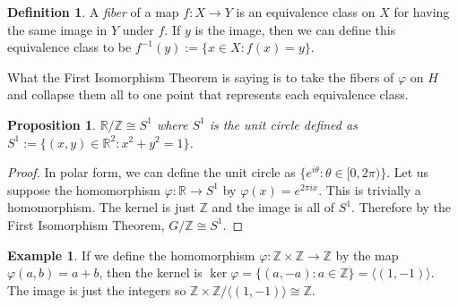 \documentclass{article}
\newcommand{\R}{\mathbb{R}}
\newcommand{\Z}{\mathbb{Z}}
\newtheorem{proposition}[theorem]{Proposition}
\theoremstyle{definition}
\newtheorem{definition}[theorem]{Definition}
\newtheorem{example}[theorem]{Example}
\begin{document}
\begin{definition}
    A \emph{fiber} of a map $f:X\to Y$ is an equivalence class on $X$ for having the same image in $Y$ under $f$. If $y$ is the image, then we can define this equivalence class to be $f^{-1}(y) := \{ x\in X:f(x)=y\}$.
\end{definition}
What the First Isomorphism Theorem is saying is to take the fibers of $\varphi$ on $H$ and collapse them all to one point that represents each equivalence class.
\begin{proposition}
    $\R/\Z \cong S^1$ where $S^1$ is the unit circle defined as $S^1 := \{ (x,y) \in \R^2 :x^2+y^2=1\}$.
\end{proposition}
\begin{proof}
    In polar form, we can define the unit circle as $\{ e^{i\theta}: \theta \in [0,2\pi ) \}$. Let us suppose the homomorphism $\varphi : \R \to S^1$ by $\varphi(x) = e^{2\pi ix}$. This is trivially a homomorphism. The kernel is just $\Z$ and the image is all of $S^1$. Therefore by the First Isomorphism Theorem, $G/\Z \cong S^1$.
\end{proof}
\begin{example}
    If we define the homomorphism $\varphi: \Z \times \Z \to \Z$ by the map $\varphi(a,b) = a+b$, then the kernel is $\ker \varphi = \{(a,-a):a\in \Z\} = \langle (1,-1)\rangle$. The image is just the integers so $\Z \times \Z / \langle(1,-1)\rangle \cong \Z$.
\end{example}
\end{document}
